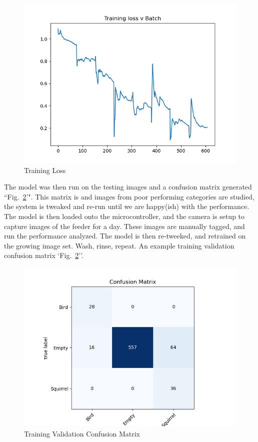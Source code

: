 \documentclass[conference]{IEEEtran}
\begin{document}
\begin{figure}[htbp]
\centerline{\includegraphics[scale=0.5]{trainingLoss.png}}
\caption{Training Loss}
\label{tLoss}
\end{figure}
The model was then run on the testing images and a confusion matrix generated ``Fig.~\ref{trainConfMat}'". This matrix is and images from poor performing categories are studied, the system is tweaked and re-run until we are happy(ish) with the performance.  The model is then loaded onto the microcontroller, and the camera is setup to capture images of the feeder for a day. These images are manually tagged, and run the performance analyzed. The model is then re-tweeked, and retrained on the growing image set. Wash, rinse, repeat. An example training validation confusion matrix `Fig.~\ref{trainConfMat}''.
\begin{figure}[htbp]
\centerline{\includegraphics[scale=0.4]{trainValConfMat.png}}
\caption{Training Validation Confusion Matrix}
\label{trainConfMat}
\end{figure}
\end{document}

